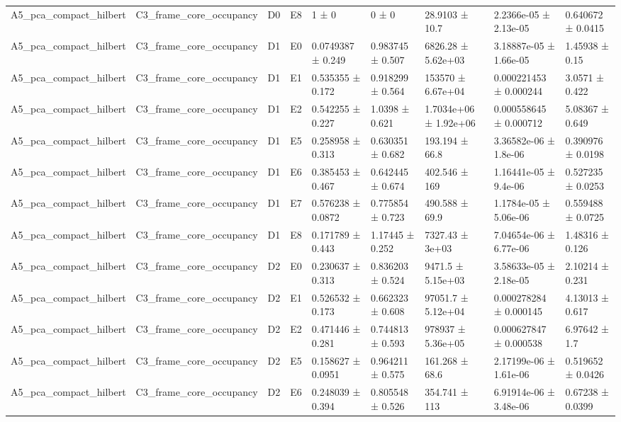 \begin{table}
\begin{tabular}{lllllllll}
A5\_pca\_compact\_hilbert & C3\_frame\_core\_occupancy & D0 & E8 & 1 ± 0 & 0 ± 0 & 28.9103 ± 10.7 & 2.2366e-05 ± 2.13e-05 & 0.640672 ± 0.0415 \\
A5\_pca\_compact\_hilbert & C3\_frame\_core\_occupancy & D1 & E0 & 0.0749387 ± 0.249 & 0.983745 ± 0.507 & 6826.28 ± 5.62e+03 & 3.18887e-05 ± 1.66e-05 & 1.45938 ± 0.15 \\
A5\_pca\_compact\_hilbert & C3\_frame\_core\_occupancy & D1 & E1 & 0.535355 ± 0.172 & 0.918299 ± 0.564 & 153570 ± 6.67e+04 & 0.000221453 ± 0.000244 & 3.0571 ± 0.422 \\
A5\_pca\_compact\_hilbert & C3\_frame\_core\_occupancy & D1 & E2 & 0.542255 ± 0.227 & 1.0398 ± 0.621 & 1.7034e+06 ± 1.92e+06 & 0.000558645 ± 0.000712 & 5.08367 ± 0.649 \\
A5\_pca\_compact\_hilbert & C3\_frame\_core\_occupancy & D1 & E5 & 0.258958 ± 0.313 & 0.630351 ± 0.682 & 193.194 ± 66.8 & 3.36582e-06 ± 1.8e-06 & 0.390976 ± 0.0198 \\
A5\_pca\_compact\_hilbert & C3\_frame\_core\_occupancy & D1 & E6 & 0.385453 ± 0.467 & 0.642445 ± 0.674 & 402.546 ± 169 & 1.16441e-05 ± 9.4e-06 & 0.527235 ± 0.0253 \\
A5\_pca\_compact\_hilbert & C3\_frame\_core\_occupancy & D1 & E7 & 0.576238 ± 0.0872 & 0.775854 ± 0.723 & 490.588 ± 69.9 & 1.1784e-05 ± 5.06e-06 & 0.559488 ± 0.0725 \\
A5\_pca\_compact\_hilbert & C3\_frame\_core\_occupancy & D1 & E8 & 0.171789 ± 0.443 & 1.17445 ± 0.252 & 7327.43 ± 3e+03 & 7.04654e-06 ± 6.77e-06 & 1.48316 ± 0.126 \\
A5\_pca\_compact\_hilbert & C3\_frame\_core\_occupancy & D2 & E0 & 0.230637 ± 0.313 & 0.836203 ± 0.524 & 9471.5 ± 5.15e+03 & 3.58633e-05 ± 2.18e-05 & 2.10214 ± 0.231 \\
A5\_pca\_compact\_hilbert & C3\_frame\_core\_occupancy & D2 & E1 & 0.526532 ± 0.173 & 0.662323 ± 0.608 & 97051.7 ± 5.12e+04 & 0.000278284 ± 0.000145 & 4.13013 ± 0.617 \\
A5\_pca\_compact\_hilbert & C3\_frame\_core\_occupancy & D2 & E2 & 0.471446 ± 0.281 & 0.744813 ± 0.593 & 978937 ± 5.36e+05 & 0.000627847 ± 0.000538 & 6.97642 ± 1.7 \\
A5\_pca\_compact\_hilbert & C3\_frame\_core\_occupancy & D2 & E5 & 0.158627 ± 0.0951 & 0.964211 ± 0.575 & 161.268 ± 68.6 & 2.17199e-06 ± 1.61e-06 & 0.519652 ± 0.0426 \\
A5\_pca\_compact\_hilbert & C3\_frame\_core\_occupancy & D2 & E6 & 0.248039 ± 0.394 & 0.805548 ± 0.526 & 354.741 ± 113 & 6.91914e-06 ± 3.48e-06 & 0.67238 ± 0.0399 \\

\end{tabular}
\end{table}
